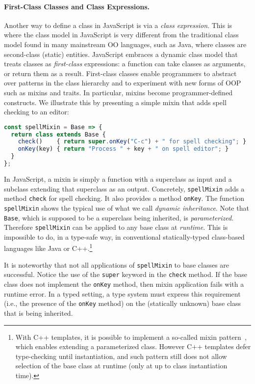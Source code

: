 \paragraph{First-Class Classes and Class Expressions.}
Another way to define a class in JavaScript is via a \emph{class expression}. This is where the class
model in JavaScript is very different from the traditional class model found in
many mainstream OO languages, such as Java, where classes are second-class
(static) entities. JavaScript embraces a dynamic class model that treats classes
as \emph{first-class} expressions: a function can take classes as arguments,
or return them as a result. First-class classes enable programmers to
abstract over patterns in the class hierarchy and to experiment with new forms of OOP
such as mixins and traits. In particular, mixins become programmer-defined
constructs. We illustrate this by presenting a simple mixin that adds
spell checking to an editor:
\begin{lstlisting}[language=JavaScript]
const spellMixin = Base => {
  return class extends Base {
    check()    { return super.onKey("C-c") + " for spell checking"; }
    onKey(key) { return "Process " + key + " on spell editor"; }
  }
};
\end{lstlisting}
In JavaScript, a mixin is simply a function with a superclass as input and a
subclass extending that superclass as an output. Concretely, \lstinline{spellMixin}
adds a method \lstinline{check} for spell checking. It also provides
a method \lstinline{onKey}.
The function \lstinline{spellMixin} shows the typical use of what we call \emph{dynamic inheritance}.
Note that \lstinline{Base}, which is supposed to be a superclass being inherited, is \emph{parameterized}.
Therefore \lstinline{spellMixin} can be applied to any base class at
\emph{runtime}. This is impossible to do, in a type-safe way, in
conventional statically-typed class-based languages like Java or
C++.\footnote{With C++ templates, it is possible to
  implement a so-called mixin pattern~\cite{DBLP:conf/gcse/SmaragdakisB00}, which enables extending
a parameterized class. However C++ templates defer type-checking until
instantiation, and such pattern still does not allow selection of the
base class at runtime (only at up to class instantiation time).}

It is noteworthy that not all applications of \lstinline{spellMixin} to base
classes are successful. Notice the use of the \lstinline{super} keyword in the
\lstinline{check} method. If the base class does not implement the
\lstinline{onKey} method, then mixin application fails with a runtime error. In
a typed setting, a type system must express this requirement (i.e., the presence of
the \lstinline{onKey} method) on the (statically unknown) base class that is
being inherited.


